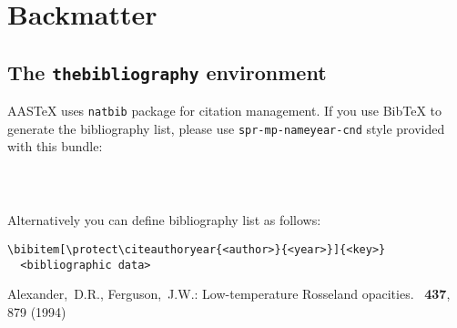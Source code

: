 \documentclass{aastex}
\begin{document}
\newpage
\section{Backmatter}


\subsection{The \texttt{thebibliography} environment}\label{ss:bib}
AASTeX uses \verb!natbib! package for citation management. 
If you use BibTeX to generate the bibliography list, please use 
\verb!spr-mp-nameyear-cnd!  style provided with this bundle: 

\smallskip
\begin{footnotesize}
\begin{verbatim}
  
                
\end{verbatim}
\end{footnotesize}
\smallskip


\noindent Alternatively  you can define bibliography list as follows:

\smallskip
\begin{footnotesize}
\begin{verbatim}
\bibitem[\protect\citeauthoryear{<author>}{<year>}]{<key>} 
  <bibliographic data>
\end{verbatim}
\end{footnotesize}


\makeatletter
\let\clear@thebibliography@page=\relax
\makeatother

\begin{thebibliography}

Alexander,~D.R., Ferguson,~J.W.: 
Low-temperature Rosseland opacities.
\apj\ \textbf{437}, 879 (1994)


\end{thebibliography}
\end{document}
